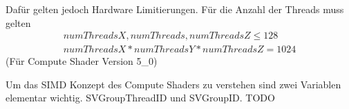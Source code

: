 Dafür gelten jedoch Hardware Limitierungen.
Für die Anzahl der Threads muss gelten
\begin{gather*}
	numThreadsX, numThreads, numThreadsZ \leq 128 \\
	numThreadsX * numThreadsY * numThreadsZ = 1024
\end{gather*}
(Für Compute Shader Version 5\_0)

Um das SIMD Konzept des Compute Shaders zu verstehen sind zwei Variablen elementar wichtig.
SVGroupThreadID und SVGroupID.
TODO
